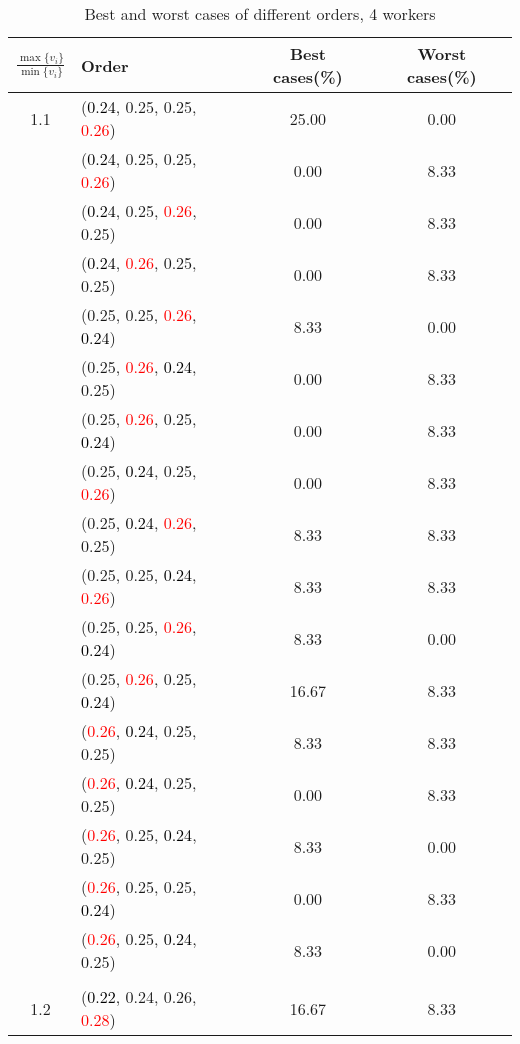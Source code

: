\documentclass[10pt,a4paper]{report}
\begin{document}
\newpage\begin{center}
	\small
	\begin{longtable}{clcc}
		\caption{Best and worst cases of different orders, 4 workers}\\
		\toprule
		\setlength{\tabcolsep}{1mm}
		\renewcommand\baselinestretch{0.5}\selectfont
		$\frac{\max\{v_i\}}{\min\{v_i\}}$ & Order & Best cases(\%) & Worst cases(\%) \\
			\midrule		1.1			&(\textcolor{black}{0.24}, 0.25, 0.25, \textcolor{red}{0.26})&25.00&0.00\\
			&(\textcolor{black}{0.24}, 0.25, 0.25, \textcolor{red}{0.26})&0.00&8.33\\
			&(\textcolor{black}{0.24}, 0.25, \textcolor{red}{0.26}, 0.25)&0.00&8.33\\
			&(\textcolor{black}{0.24}, \textcolor{red}{0.26}, 0.25, 0.25)&0.00&8.33\\
			&(0.25, 0.25, \textcolor{red}{0.26}, \textcolor{black}{0.24})&8.33&0.00\\
			&(0.25, \textcolor{red}{0.26}, \textcolor{black}{0.24}, 0.25)&0.00&8.33\\
			&(0.25, \textcolor{red}{0.26}, 0.25, \textcolor{black}{0.24})&0.00&8.33\\
			&(0.25, \textcolor{black}{0.24}, 0.25, \textcolor{red}{0.26})&0.00&8.33\\
			&(0.25, \textcolor{black}{0.24}, \textcolor{red}{0.26}, 0.25)&8.33&8.33\\
			&(0.25, 0.25, \textcolor{black}{0.24}, \textcolor{red}{0.26})&8.33&8.33\\
			&(0.25, 0.25, \textcolor{red}{0.26}, \textcolor{black}{0.24})&8.33&0.00\\
			&(0.25, \textcolor{red}{0.26}, 0.25, \textcolor{black}{0.24})&16.67&8.33\\
			&(\textcolor{red}{0.26}, \textcolor{black}{0.24}, 0.25, 0.25)&8.33&8.33\\
			&(\textcolor{red}{0.26}, \textcolor{black}{0.24}, 0.25, 0.25)&0.00&8.33\\
			&(\textcolor{red}{0.26}, 0.25, \textcolor{black}{0.24}, 0.25)&8.33&0.00\\
			&(\textcolor{red}{0.26}, 0.25, 0.25, \textcolor{black}{0.24})&0.00&8.33\\
			&(\textcolor{red}{0.26}, 0.25, \textcolor{black}{0.24}, 0.25)&8.33&0.00\\
		&&&\\
		1.2			&(\textcolor{black}{0.22}, 0.24, 0.26, \textcolor{red}{0.28})&16.67&8.33\\

\end{longtable}
\end{center}
\end{document}
